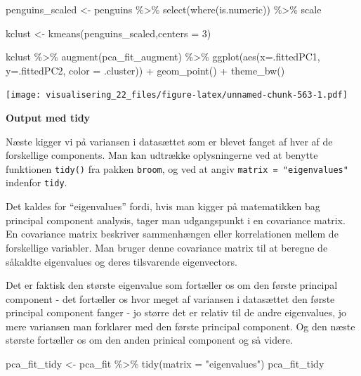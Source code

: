 \documentclass[
]{book}
\newenvironment{Shaded}{\begin{snugshade}}{\end{snugshade}}
\newcommand{\AttributeTok}[1]{\textcolor[rgb]{0.77,0.63,0.00}{#1}}
\newcommand{\DecValTok}[1]{\textcolor[rgb]{0.00,0.00,0.81}{#1}}
\newcommand{\FunctionTok}[1]{\textcolor[rgb]{0.00,0.00,0.00}{#1}}
\newcommand{\NormalTok}[1]{#1}
\newcommand{\OtherTok}[1]{\textcolor[rgb]{0.56,0.35,0.01}{#1}}
\newcommand{\SpecialCharTok}[1]{\textcolor[rgb]{0.00,0.00,0.00}{#1}}
\newcommand{\StringTok}[1]{\textcolor[rgb]{0.31,0.60,0.02}{#1}}
\begin{document}
\begin{Shaded}
\begin{Highlighting}[]
\NormalTok{penguins\_scaled }\OtherTok{\textless{}{-}}\NormalTok{ penguins }\SpecialCharTok{\%\textgreater{}\%} \FunctionTok{select}\NormalTok{(}\FunctionTok{where}\NormalTok{(is.numeric)) }\SpecialCharTok{\%\textgreater{}\%}\NormalTok{ scale}

\NormalTok{kclust }\OtherTok{\textless{}{-}} \FunctionTok{kmeans}\NormalTok{(penguins\_scaled,}\AttributeTok{centers =} \DecValTok{3}\NormalTok{)}

\NormalTok{kclust }\SpecialCharTok{\%\textgreater{}\%} \FunctionTok{augment}\NormalTok{(pca\_fit\_augment)  }\SpecialCharTok{\%\textgreater{}\%} 
  \FunctionTok{ggplot}\NormalTok{(}\FunctionTok{aes}\NormalTok{(}\AttributeTok{x=}\NormalTok{.fittedPC1, }\AttributeTok{y=}\NormalTok{.fittedPC2, }\AttributeTok{color =}\NormalTok{ .cluster)) }\SpecialCharTok{+} 
  \FunctionTok{geom\_point}\NormalTok{() }\SpecialCharTok{+}
  \FunctionTok{theme\_bw}\NormalTok{()}
\end{Highlighting}
\end{Shaded}

\texttt{[image: visualisering\_22\_files/figure-latex/unnamed-chunk-563-1.pdf]}

\textbf{Output med tidy}

Næste kigger vi på variansen i datasættet som er blevet fanget af hver af de forskellige components. Man kan udtrække oplysningerne ved at benytte funktionen \texttt{tidy()} fra pakken \texttt{broom}, og ved at angiv \texttt{matrix\ =\ "eigenvalues"} indenfor \texttt{tidy}.

Det kaldes for ``eigenvalues'' fordi, hvis man kigger på matematikken bag principal component analysis, tager man udgangspunkt i en covariance matrix. En covariance matrix beskriver sammenhængen eller korrelationen mellem de forskellige variabler. Man bruger denne covariance matrix til at beregne de såkaldte eigenvalues og deres tilsvarende eigenvectors.

Det er faktisk den største eigenvalue som fortæller os om den første principal component - det fortæller os hvor meget af variansen i datasættet den første principal component fanger - jo større det er relativ til de andre eigenvalues, jo mere variansen man forklarer med den første principal component. Og den næste største fortæller os om den anden prinical component og så videre.

\begin{Shaded}
\begin{Highlighting}[]
\NormalTok{pca\_fit\_tidy }\OtherTok{\textless{}{-}}\NormalTok{ pca\_fit }\SpecialCharTok{\%\textgreater{}\%}
  \FunctionTok{tidy}\NormalTok{(}\AttributeTok{matrix =} \StringTok{"eigenvalues"}\NormalTok{)}
\NormalTok{pca\_fit\_tidy}
\end{Highlighting}
\end{Shaded}
\end{document}

